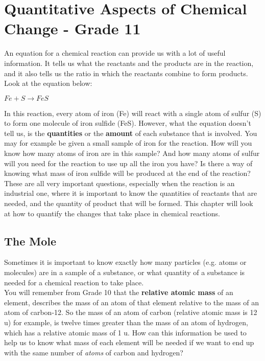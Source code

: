 \chapter{Quantitative Aspects of Chemical Change - Grade 11}
\label{chap:quant}

An equation for a chemical reaction can provide us with a lot of useful information. It tells us what the reactants and the products are in the reaction, and it also tells us the ratio in which the reactants combine to form products. Look at the equation below:

\begin{center}
\rm${Fe + S \rightarrow FeS}$\\
\end{center}

In this reaction, every atom of iron (Fe) will react with a single atom of sulfur (S) to form one molecule of iron sulfide (FeS). However, what the equation doesn't tell us, is the \textbf{quantities} or the \textbf{amount} of each substance that is involved. You may for example be given a small sample of iron for the reaction. How will you know how many atoms of iron are in this sample? And how many atoms of sulfur will you need for the reaction to use up all the iron you have? Is there a way of knowing what mass of iron sulfide will be produced at the end of the reaction? These are all very important questions, especially when the reaction is an industrial one, where it is important to know the quantities of reactants that are needed, and the quantity of product that will be formed. This chapter will look at how to quantify the changes that take place in chemical reactions.




\section{The Mole}
\label{sec:quant:mole}

Sometimes it is important to know exactly how many particles (e.g. atoms or molecules) are in a sample of a substance, or what quantity of a substance is needed for a chemical reaction to take place.\\

You will remember from Grade 10 that the \textbf{relative atomic mass} of an element, describes the mass of an atom of that element relative to the mass of an atom of carbon-12. So the mass of an atom of carbon (relative atomic mass is 12 u) for example, is twelve times greater than the mass of an atom of hydrogen, which has a relative atomic mass of 1 u. How can this information be used to help us to know what mass of each element will be needed if we want to end up with the same number of \textit{atoms} of carbon and hydrogen?\\


